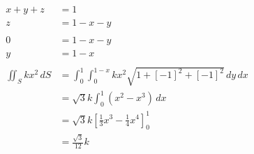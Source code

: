 \documentclass{article}
\begin{document}
\setcounter{subsubsection}{26}
\subsubsection{}

\begin{align*}
  x + y + z          & = 1                                                                  \\
  z                  & = 1 - x - y                                                          \\ \\
  0                  & = 1 - x - y                                                          \\
  y                  & = 1 - x                                                              \\ \\
  \iint_S k x^2 \,dS & = \int_0^1 \int_0^{1 - x} k x^2 \sqrt{1 + [-1]^2 + [-1]^2} \,dy \,dx \\
                     & = \sqrt{3} k \int_0^1 (x^2 - x^3) \,dx                               \\
                     & = \sqrt{3} k \left[ \frac{1}{3} x^3 - \frac{1}{4} x^4 \right]_0^1    \\
                     & = \frac{\sqrt{3}}{12} k
\end{align*}

\setcounter{subsubsection}{28}
\subsubsection{}
\end{document}
